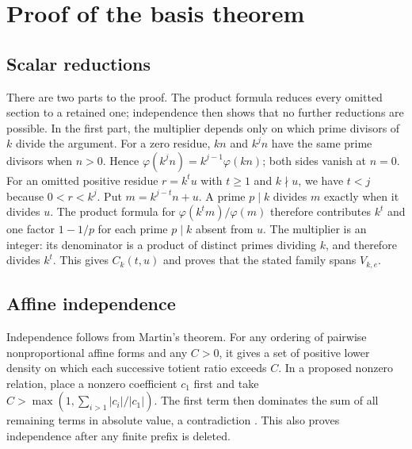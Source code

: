 \documentclass[11pt]{article}
\begin{document}
\section{Proof of the basis theorem}\label{sec:rank}
\subsection*{Scalar reductions}
There are two parts to the proof. The product formula reduces every
omitted section to a retained one; independence then shows that no
further reductions are possible. In the first part, the multiplier
depends only on which prime divisors of $k$ divide the argument.
For a zero residue, $kn$ and $k^jn$ have the same prime divisors when
$n>0$. Hence
$\varphi(k^jn)=k^{j-1}\varphi(kn)$; both sides vanish at $n=0$.
For an omitted positive residue $r=k^tu$ with $t\ge1$ and $k\nmid u$,
we have $t<j$ because $0<r<k^j$. Put $m=k^{j-t}n+u$. A prime $p\mid k$ divides $m$ exactly when it divides
$u$. The product formula for $\varphi(k^tm)/\varphi(m)$ therefore
contributes $k^t$ and one factor $1-1/p$ for each prime $p\mid k$
absent from $u$. The multiplier is an integer: its denominator is a
product of distinct primes dividing $k$, and therefore divides $k^t$.
This gives $C_k(t,u)$ and proves that the stated family spans $V_{k,e}$.

\subsection*{Affine independence}
Independence follows from Martin's theorem. For any ordering of
pairwise nonproportional affine forms and any $C>0$, it gives a set
of positive lower density on which each successive totient ratio
exceeds $C$. In a proposed nonzero relation, place a nonzero
coefficient $c_1$ first and take
$C>\max(1,\sum_{i>1}|c_i|/|c_1|)$. The first term then dominates
the sum of all remaining terms in absolute value, a contradiction
\cite[Thm.~1]{martin-phi-inequalities}. This also proves independence
after any finite prefix is deleted.
\end{document}
